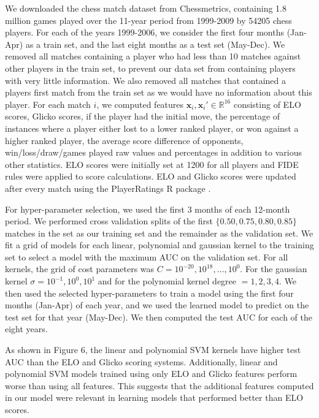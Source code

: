 \documentclass[twoside,11pt]{article}
\newcommand{\RR}{\mathbb R}
\begin{document}
We downloaded the chess match dataset from Chessmetrics, containing
1.8 million games played over the 11-year period from 1999-2009 by
54205 chess players.  For each of the years 1999-2006, we consider the
first four months (Jan-Apr) as a train set, and the last eight months
as a test set (May-Dec). 
We
removed all matches containing a player who had less than 10 matches
against other players in the train set, to prevent our data set from
containing players with very little information.  We also removed all
matches that contained a players first match from the train set as we
would have no information about this player.
For each match $i$, we computed features
$\mathbf x_i,\mathbf x_i'\in\RR^{16}$ consisting of ELO
scores, Glicko scores, if the player had the initial move, the
percentage of instances where a player either lost to a lower ranked
player, or won against a higher ranked player, the average score
difference of opponents, win/loss/draw/games played raw values and
percentages in addition to various other statistics. ELO scores were
initially set at 1200 for all players and FIDE rules were applied to
score calculations.  ELO and Glicko scores were updated after every
match using the PlayerRatings R package  \citep{play-raitings}.  

For hyper-parameter selection, we used the first 3 months of each
12-month period.  We performed cross validation splits of the first
$\{0.50,0.75,0.80,0.85\}$ matches in the set as our training set and
the remainder as the validation set.  We fit a grid of models for each
linear, polynomial and gaussian kernel to the training set to select a
model with the maximum AUC on the validation set.  For all kernels, the grid of cost parameters was $C=10^{-20},10^{18}, \dots,10^0$. For the gaussian kernel $\sigma = 10^{-1},10^{0},10^1$ and for the polynomial kernel degree $=1,2,3,4$.  We then used the selected hyper-parameters to train a
model using the first four months (Jan-Apr) of each year, and we used
the learned model to predict on the test set for that year
(May-Dec). We then computed the test AUC for each of the eight years. 

As shown in Figure 6, the linear and polynomial SVM kernels have
higher test AUC than the ELO and Glicko scoring systems.
Additionally, linear and polynomial SVM models trained using only ELO
and Glicko features perform worse than using all features. This
suggests that the additional features computed in our model were
relevant in learning models that performed better than ELO scores.
\end{document}
